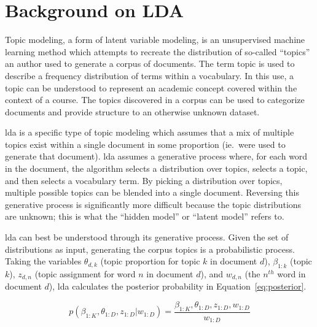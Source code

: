 \section{Background on LDA}
\label{sec:background}


Topic modeling, a form of latent variable modeling, is an unsupervised machine learning method which attempts to recreate the distribution of so-called ``topics'' an author used to generate a corpus of documents.
The term topic is used to describe a frequency distribution of terms within a vocabulary.
In this use, a topic can be understood to represent an academic concept covered within the context of a course.
The topics discovered in a corpus can be used to categorize documents and provide structure to an otherwise unknown dataset.


\acf{lda} is a specific type of topic modeling which assumes that a mix of multiple topics exist within a single document in some proportion (ie.\ were used to generate that document). \cite{Blei2003}
\ac{lda} assumes a generative process where, for each word in the document, the algorithm selects a distribution over topics, selects a topic, and then selects a vocabulary term. \cite{Blei2003}
By picking a distribution over topics, multiple possible topics can be blended into a single document.
Reversing this generative process is significantly more difficult because the topic distributions are unknown; this is what the ``hidden model'' or ``latent model'' refers to.


\ac{lda} can best be understood through its generative process.
Given the set of distributions as input, generating the corpus topics is a probabilistic process.
Taking the variables $\theta_{d,k}$ (topic proportion for topic $k$ in document $d$), $\beta_{1:k}$ (topic $k$), $z_{d,n}$ (topic assignment for word $n$ in document $d$), and $w_{d,n}$ (the $n^{th}$ word in document $d$), \ac{lda} calculates the posterior probability in Equation~\ref{eq:posterior}. \cite{Blei2012}

\begin{equation}
p(\beta_{1:K}, \theta_{1:D},z_{1:D} | w_{1:D}) = \frac{\beta_{1:K},
\theta_{1:D},z_{1:D}, w_{1:D}}{w_{1:D}}
\label{eq:posterior}
\end{equation}

